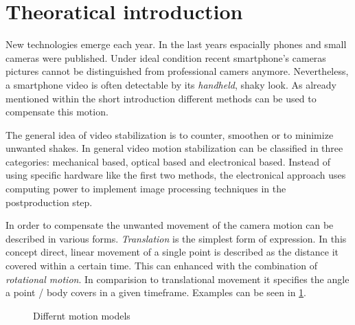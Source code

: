 \section{Theoratical introduction}
New technologies emerge each year. In the last years espacially phones and small cameras were published. Under ideal condition recent smartphone's cameras pictures cannot be distinguished from professional camers anymore. Nevertheless, a smartphone video is often detectable by its \textit{handheld}, shaky look. As already mentioned within the short introduction different methods can be used to compensate this motion.

The general idea of video stabilization is to counter, smoothen or to minimize unwanted shakes. In general video motion stabilization can be classified in three categories: mechanical based, optical based and electronical based. Instead of using specific hardware like the first two methods, the electronical approach uses computing power to implement image processing techniques in the  postproduction step. \cite{blockTang}

In order to compensate the unwanted movement of the camera motion can be described in various forms. \textit{Translation} is the simplest form of expression. In this concept direct, linear movement of a single point is described as the distance it covered within a certain time. This can enhanced with the combination of \textit{rotational motion}.  In comparision to translational movement it specifies the angle a point / body covers in a given timeframe. Examples can be seen in \cref{fig:motionmodels}.
\begin{figure}\centering
    \begin{minipage}{.45\textwidth}\centering
    \end{minipage}
    \begin{minipage}{.45\textwidth}\centering
    \end{minipage}
    \caption{Differnt motion models}
    \label{fig:motionmodels}
\end{figure}


